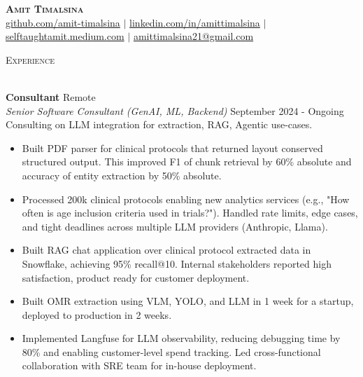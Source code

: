 \documentclass[a4paper]{article}
\newcommand{\lineunder} {
    \vspace*{-8pt} \\
    \hspace*{-18pt} \hrulefill \\
}
\newcommand{\header} [1] {
    {\hspace*{-18pt}\vspace*{6pt} \textsc{#1}}
    \vspace*{-6pt} \lineunder
}
\begin{document}
\vspace*{-40pt}

    

\vspace*{-10pt}
\begin{center}
	\textbf{\Huge \scshape {Amit Timalsina}} \\ \vspace{3pt}
    \small
    \href{https://github.com/amit-timalsina}{github.com/amit-timalsina}
    $|$
    \href{https://www.linkedin.com/in/amittimalsina}{linkedin.com/in/amittimalsina}
    $|$
    \href{https://selftaughtamit.medium.com/}{selftaughtamit.medium.com}
    $|$
    \href{mailto:amittimlasina21@gmail.com}{amittimalsina21@gmail.com} \\
\end{center}

\header{Experience}
\vspace{1mm}

\textbf{Consultant} \hfill Remote\\
\textit{Senior Software Consultant (GenAI, ML, Backend)} \hfill September 2024 - Ongoing\\
{Consulting on LLM integration for extraction, RAG, Agentic use-cases.}
\vspace{-1mm}
\begin{itemize} \itemsep 0pt
	\item Built PDF parser for clinical protocols that returned layout conserved structured output. This improved F1 of chunk retrieval by 60\% absolute and accuracy of entity extraction by 50\% absolute.
	\item Processed 200k clinical protocols enabling new analytics services (e.g., "How often is age inclusion criteria used in trials?"). Handled rate limits, edge cases, and tight deadlines across multiple LLM providers (Anthropic, Llama).
	\item Built RAG chat application over clinical protocol extracted data in Snowflake, achieving 95\% recall@10. Internal stakeholders reported high satisfaction, product ready for customer deployment.
    \item Built OMR extraction using VLM, YOLO, and LLM in 1 week for a startup, deployed to production in 2 weeks. 
	\item Implemented Langfuse for LLM observability, reducing debugging time by 80\% and enabling customer-level spend tracking. Led cross-functional collaboration with SRE team for in-house deployment.
\end{itemize}
\end{document}
